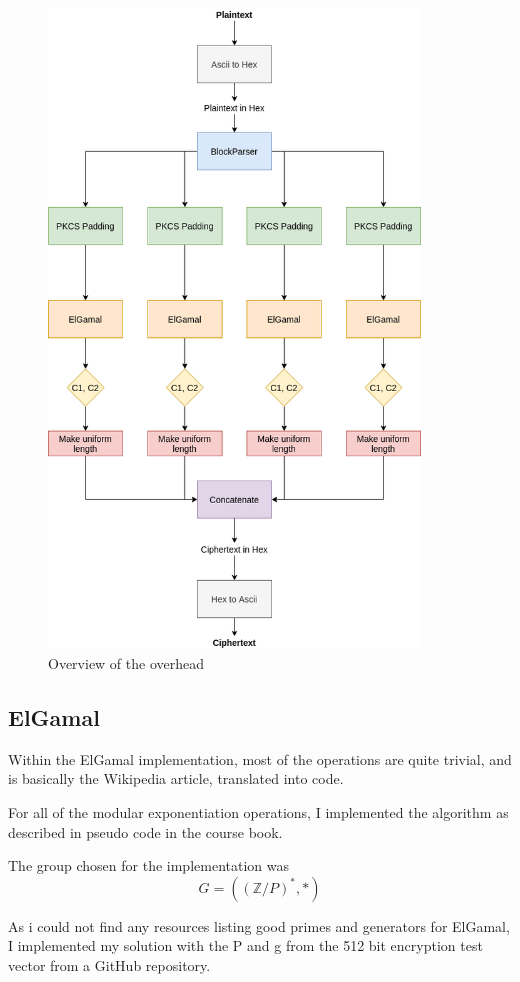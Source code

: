 \documentclass{article}
\begin{document}
\begin{figure}[H]
 \centering
  \includegraphics[width=280pt]{img/overview.png}
 \caption{Overview of the overhead}
 \label{rOVERHEAD}
 \end{figure}

\subsection{ElGamal}

Within the ElGamal implementation, most of the operations are quite trivial, and is basically the Wikipedia article, translated into code.

For all of the modular exponentiation operations, I implemented the algorithm as described in pseudo code in the course book\cite{ROSEN}.

The group chosen for the implementation was
\begin{equation*}
  G =((\mathbb{Z}/P)^{*}, *)
\end{equation*}

As i could not find any resources listing good primes and generators for ElGamal, I implemented my solution with the P and g from the 512 bit encryption test vector from a GitHub repository\cite{PG}.
\end{document}
